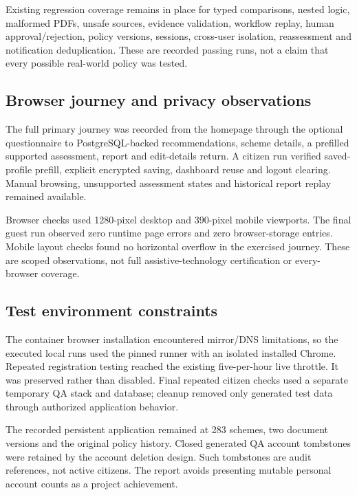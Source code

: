\documentclass[12pt,a4paper,twoside]{report}
\begin{document}
Existing regression coverage remains in place for typed comparisons, nested logic, malformed PDFs, unsafe sources, evidence validation, workflow replay, human approval/rejection, policy versions, sessions, cross-user isolation, reassessment and notification deduplication. These are recorded passing runs, not a claim that every possible real-world policy was tested.

\subsection*{Browser journey and privacy observations}

The full primary journey was recorded from the homepage through the optional questionnaire to PostgreSQL-backed recommendations, scheme details, a prefilled supported assessment, report and edit-details return. A citizen run verified saved-profile prefill, explicit encrypted saving, dashboard reuse and logout clearing. Manual browsing, unsupported assessment states and historical report replay remained available.

Browser checks used 1280-pixel desktop and 390-pixel mobile viewports. The final guest run observed zero runtime page errors and zero browser-storage entries. Mobile layout checks found no horizontal overflow in the exercised journey. These are scoped observations, not full assistive-technology certification or every-browser coverage.

\subsection*{Test environment constraints}

The container browser installation encountered mirror/DNS limitations, so the executed local runs used the pinned runner with an isolated installed Chrome. Repeated registration testing reached the existing five-per-hour live throttle. It was preserved rather than disabled. Final repeated citizen checks used a separate temporary QA stack and database; cleanup removed only generated test data through authorized application behavior.

The recorded persistent application remained at 283 schemes, two document versions and the original policy history. Closed generated QA account tombstones were retained by the account deletion design. Such tombstones are audit references, not active citizens. The report avoids presenting mutable personal account counts as a project achievement.
\end{document}
